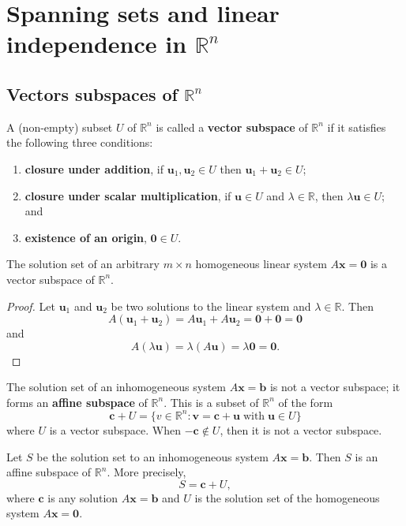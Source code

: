 \chapter{Spanning sets and linear independence in $\mathbb R^n$}

\section{Vectors subspaces of $\mathbb R^n$}

\begin{definition}
    A (non-empty) subset $U$ of $\mathbb R^n$ is called a \textbf{vector subspace} of $\mathbb R^n$ if it satisfies the following three conditions:
    \begin{enumerate}
        \item \textbf{closure under addition}, if $\bm u_1,\bm u_2\in U$ then $\bm u_1+\bm u_2\in U$;
        \item \textbf{closure under scalar multiplication}, if $\bm u\in U$ and $\lambda\in\mathbb R$, then $\lambda\bm u\in U$; and
        \item \textbf{existence of an origin}, $\bm 0\in U$.
    \end{enumerate}
\end{definition}

\begin{proposition}
    The solution set of an arbitrary $m\times n$ homogeneous linear system $A\bm x=\bm0$ is a vector subspace of $\mathbb R^n$.
\end{proposition}

\begin{proof}
    Let $\bm u_1$ and $\bm u_2$ be two solutions to the linear system and $\lambda\in\mathbb R$. Then \[A(\bm u_1+\bm u_2)=A\bm u_1+A\bm u_2=\bm 0+\bm 0=\bm 0\] and \[A(\lambda\bm u)=\lambda(A\bm u)=\lambda\bm0=\bm0.\]
\end{proof}

\begin{definition}
    The solution set of an inhomogeneous system $A\bm x=\bm b$ is not a vector subspace; it forms an \textbf{affine subspace} of $\mathbb R^n$. This is a subset of $\mathbb R^n$ of the form \[\bm c+U=\{v\in\mathbb R^n:\bm v=\bm c+\bm u\;\text{with}\;\bm u\in U\}\] where $U$ is a vector subspace. When $-\bm c\not\in U$, then it is not a vector subspace.
\end{definition}

\begin{proposition}
    Let $S$ be the solution set to an inhomogeneous system $A\bm x=\bm b$. Then $S$ is an affine subspace of $\mathbb R^n$. More precisely, \[S=\bm c+U,\] where $\bm c$ is any solution $A\bm x=\bm b$ and $U$ is the solution set of the homogeneous system $A\bm x=\bm 0$.
\end{proposition}

